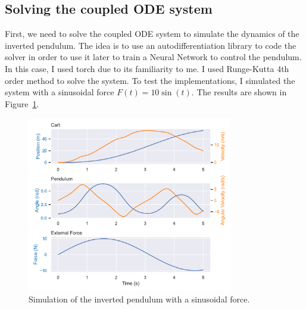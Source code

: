 \documentclass[unicode,11pt,a4paper,oneside,numbers=endperiod,openany]{scrartcl}
\begin{document}
\subsection*{Solving the coupled ODE system}
First, we need to solve the coupled ODE system to simulate the dynamics of the
inverted pendulum.
The idea is to use an autodifferentiation library to code the solver in order to
use it later to train a Neural Network to control the pendulum. In this case, I
used torch due to its familiarity to me.
I used Runge-Kutta 4th order method to solve the system. To test the
implementations, I simulated the system with a sinusoidal force $F(t) = 10
\sin(t)$.
The results are shown in Figure~\ref{fig:pendulum}.
\begin{figure}[h]
    \centering
    \includegraphics[width=0.8\textwidth]{../Task1/pendulum.pdf}
    \caption{Simulation of the inverted pendulum with a sinusoidal force.}
    \label{fig:pendulum}
\end{figure}
\end{document}
